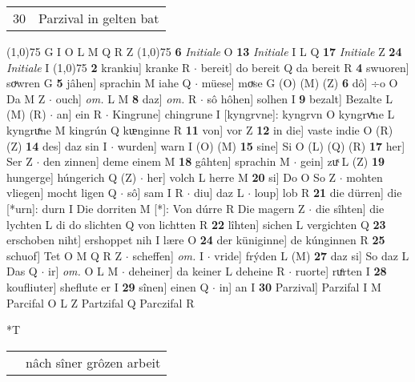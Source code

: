 \documentclass[8pt,a4paper,notitlepage]{article}
\begin{document}
\begin{table}[ht]
\begin{minipage}[t]{0.5\linewidth}
\begin{tabular}{rl}
30 & Parzival in gelten bat\\ 
\end{tabular}
\scriptsize
\line(1,0){75} \newline
G I O L M Q R Z \newline
\line(1,0){75} \newline
\textbf{6} \textit{Initiale} O  \textbf{13} \textit{Initiale} I L Q  \textbf{17} \textit{Initiale} Z  \textbf{24} \textit{Initiale} I  \newline
\line(1,0){75} \newline
\textbf{2} krankiu] kranke R  $\cdot$ bereit] do bereit Q da bereit R \textbf{4} swuoren] soͮwren G \textbf{5} jâhen] sprachin M iahe Q  $\cdot$ müese] moͮse G (O) (M) (Z) \textbf{6} dô] ÷o O Da M Z  $\cdot$ ouch] \textit{om.} L M \textbf{8} daz] \textit{om.} R  $\cdot$ sô hôhen] solhen I \textbf{9} bezalt] Bezalte L (M) (R)  $\cdot$ an] ein R  $\cdot$ Kingrune] chingrune I [kyngrvne]: kyngrvn O kyngrvͯne L kyngruͯne M kingrún Q kᵫnginne R \textbf{11} von] vor Z \textbf{12} in die] vaste indie O (R) (Z) \textbf{14} des] daz sin I  $\cdot$ wurden] warn I (O) (M) \textbf{15} sine] Si O (L) (Q) (R) \textbf{17} her] Ser Z  $\cdot$ den zinnen] deme einem M \textbf{18} gâhten] sprachin M  $\cdot$ gein] zuͯ L (Z) \textbf{19} hungerge] húngerich Q (Z)  $\cdot$ her] volch L herre M \textbf{20} si] Do O So Z  $\cdot$ mohten vliegen] mocht ligen Q  $\cdot$ sô] sam I R  $\cdot$ diu] daz L  $\cdot$ loup] lob R \textbf{21} die dürren] die [*urn]: durn I Die dorriten M [*]: Von dúrre R Die magern Z  $\cdot$ die sîhten] die lychten L di do slichten Q von lichtten R \textbf{22} lîhten] sichen L vergichten Q \textbf{23} erschoben niht] ershoppet nih I lære O \textbf{24} der küniginne] de kúnginnen R \textbf{25} schuof] Tet O M Q R Z  $\cdot$ scheffen] \textit{om.} I  $\cdot$ vride] frýden L (M) \textbf{27} daz si] So daz L Das Q  $\cdot$ ir] \textit{om.} O L M  $\cdot$ deheiner] da keiner L deheine R  $\cdot$ ruorte] ruͤrten I \textbf{28} koufliuter] sheflute er I \textbf{29} sînen] einen Q  $\cdot$ in] an I \textbf{30} Parzival] Parzifal I M Parcifal O L Z Partzifal Q Parczifal R \newline
\end{minipage}
\hspace{0.5cm}
\begin{minipage}[t]{0.5\linewidth}
\small
\begin{center}*T
\end{center}
\begin{tabular}{rl}
 & nâch sîner grôzen arbeit\\ 

\end{tabular}
\end{minipage}
\end{table}
\end{document}
